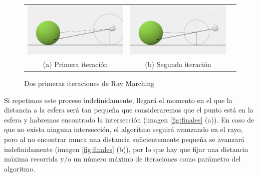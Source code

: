 \begin{figure}[ht]
    \centering
    \begin{tabular}{ccc}
      \includegraphics[scale=0.17]{img/C8/ray-marching-1.png} &     \includegraphics[scale=0.17]{img/C8/ray-marching-2.png} \\
    (a) Primera iteración & (b) Segunda iteración \\[6pt]
    \end{tabular}
    \caption{Dos primeras iteraciones de Ray Marching}
    \label{fig:iteraciones-RM}
\end{figure}

Si repetimos este proceso indefinidamente, llegará el momento en el que la distancia a la esfera será tan pequeña que consideraremos que el punto está en la esfera y habremos encontrado la intersección (imagen \ref{fig:finales} (a)). En caso de que no exista ninguna intersección, el algoritmo seguirá avanzando en el rayo, pero al no encontrar nunca una distancia suficientemente pequeña se avanzará indefinidamente (imagen \ref{fig:finales} (b)), por lo que hay que fijar una distancia máxima recorrida y/o un número máximo de iteraciones como parámetro del algoritmo.

